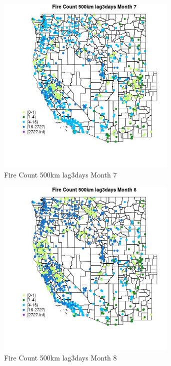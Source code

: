 \begin{figure} 
\centering  
\includegraphics[width=0.77\textwidth]{Code_Outputs/Report_ML_input_PM25_Step4_part_f_de_duplicated_aves_prioritize_24hr_obswNAs_MapObsMo7Fire_Count_500km_lag3days.jpg} 
\caption{\label{fig:Report_ML_input_PM25_Step4_part_f_de_duplicated_aves_prioritize_24hr_obswNAsMapObsMo7Fire_Count_500km_lag3days}Fire Count 500km lag3days Month 7} 
\end{figure} 
 

\clearpage 

\begin{figure} 
\centering  
\includegraphics[width=0.77\textwidth]{Code_Outputs/Report_ML_input_PM25_Step4_part_f_de_duplicated_aves_prioritize_24hr_obswNAs_MapObsMo8Fire_Count_500km_lag3days.jpg} 
\caption{\label{fig:Report_ML_input_PM25_Step4_part_f_de_duplicated_aves_prioritize_24hr_obswNAsMapObsMo8Fire_Count_500km_lag3days}Fire Count 500km lag3days Month 8} 
\end{figure} 
 

